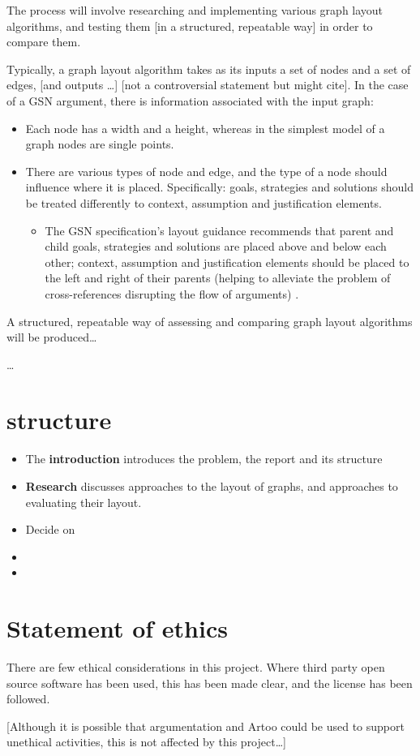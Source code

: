 The process will involve researching and implementing various graph layout algorithms,
and testing them [in a structured, repeatable way] in order to compare them. 

Typically, a graph layout algorithm takes as its inputs a set of nodes and a set of edges, [and outputs \ldots] [not a controversial statement but might cite].
In the case of a GSN argument, there is  information associated with the input graph:

\begin{itemize}
  \item
    Each node has a width and a height, whereas in the simplest model of a graph nodes are single points. 
  \item
    There are various types of node and edge, and the type of a node should influence where it is placed. Specifically: goals, strategies and solutions should be treated differently to context, assumption and justification elements.
    \begin{itemize}
    \item The GSN specification's layout guidance \citep[section~2.2, pp.~26--27]{gsnstandard} recommends that parent and child goals, strategies and solutions are placed above and below each other; context, assumption and justification elements should be placed to the left and right of their parents (helping to alleviate the problem of cross-references disrupting the flow of arguments) .
    \end{itemize}
\end{itemize}


A structured, repeatable way of assessing and comparing graph layout algorithms will be produced\ldots

\ldots


\section{structure}

\begin{itemize}
\item The \textbf{introduction} introduces the problem, the report and its structure
\item \textbf{Research} discusses approaches to the layout of graphs, and approaches to evaluating their layout.
\item Decide on
\item
\item
\end{itemize}


\section{Statement of ethics}

There are few ethical considerations in this project. 
Where third party open source software has been used, this has been made clear, and the license has been followed.

[Although it is possible that argumentation and Artoo could be used to support unethical activities, this  is not affected by this project\ldots]
